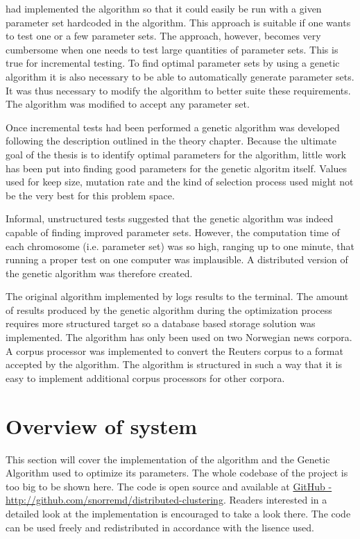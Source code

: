 \supervisor had implemented the algorithm so that it could easily be run with a given parameter set hardcoded in the algorithm. This approach is suitable if one wants to test one or a few parameter sets. The approach, however, becomes very cumbersome when one needs to test large quantities of parameter sets. This is true for incremental testing. To find optimal parameter sets by using a genetic algorithm it is also necessary to be able to automatically generate parameter sets. It was thus necessary to modify the algorithm to better suite these requirements. The algorithm was modified to accept any parameter set.

Once incremental tests had been performed a genetic algorithm was developed following the description outlined in the theory chapter. Because the ultimate goal of the thesis is to identify optimal parameters for the \CTC algorithm, little work has been put into finding good parameters for the genetic algoritm itself. Values used for keep size, mutation rate and the kind of selection process used might not be the very best for this problem space.

Informal, unstructured tests suggested that the genetic algorithm was indeed capable of finding improved parameter sets. However, the computation time of each chromosome (i.e. parameter set) was so high, ranging up to one minute, that running a proper test on one computer was implausible. A distributed version of the genetic algorithm was therefore created.

The original \CTC algorithm implemented by \supervisor logs results to the terminal. The amount of results produced by the genetic algorithm during the optimization process requires more structured target so a database based storage solution was implemented. The \CTC algorithm has only been used on two Norwegian news corpora. A corpus processor was implemented to convert the Reuters corpus to a format accepted by the \CTC algorithm. The algorithm is structured in such a way that it is easy to implement additional corpus processors for other corpora.


\section{Overview of system}
This section will cover the implementation of the \CTC algorithm and the Genetic Algorithm used to optimize its parameters. The whole codebase of the project is too big to be shown here. The code is open source and available at \href{http://github.com/snorremd/distributed-clustering}{GitHub - http://github.com/snorremd/distributed-clustering}. Readers interested in a detailed look at the implementation is encouraged to take a look there. The code can be used freely and redistributed in accordance with the lisence used.


